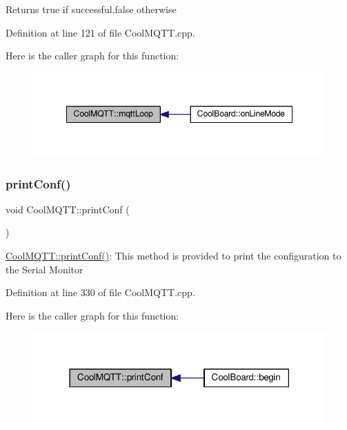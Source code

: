 \begin{DoxyReturn}{Returns}
true if successful,false otherwise 
\end{DoxyReturn}


Definition at line 121 of file Cool\+M\+Q\+T\+T.\+cpp.

Here is the caller graph for this function\+:\nopagebreak
\begin{figure}[H]
\begin{center}
\leavevmode
\includegraphics[width=348pt]{class_cool_m_q_t_t_aa5eaae967b562b62cbcf2b8d81f6e5d5_icgraph}
\end{center}
\end{figure}
\mbox{\label{class_cool_m_q_t_t_a40553a0ad4b5ecf1cb4411ab54ca85fb}} 
\subsubsection{\texorpdfstring{print\+Conf()}{printConf()}}
{\footnotesize\ttfamily void Cool\+M\+Q\+T\+T\+::print\+Conf (\begin{DoxyParamCaption}{ }\end{DoxyParamCaption})}

\hyperlink{class_cool_m_q_t_t_a40553a0ad4b5ecf1cb4411ab54ca85fb}{Cool\+M\+Q\+T\+T\+::print\+Conf()}\+: This method is provided to print the configuration to the Serial Monitor 

Definition at line 330 of file Cool\+M\+Q\+T\+T.\+cpp.

Here is the caller graph for this function\+:\nopagebreak
\begin{figure}[H]
\begin{center}
\leavevmode
\includegraphics[width=318pt]{class_cool_m_q_t_t_a40553a0ad4b5ecf1cb4411ab54ca85fb_icgraph}
\end{center}
\end{figure}
\mbox{\label{class_cool_m_q_t_t_ace977b3e90ab14b1199fe5c4fb0a13ec}} 
